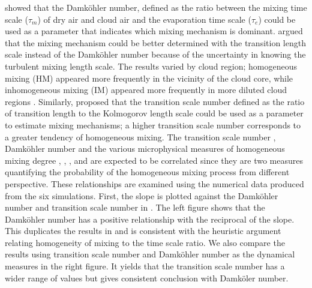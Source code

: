 \cite{Burnet2007Observational} showed that the Damk\"{o}hler number, defined as the ratio between the mixing time scale ($\tau_m$) of dry air and cloud air and the evaporation time scale ($\tau_e$) could be used as a parameter that indicates which mixing mechanism is dominant. \cite{Lehmann2009} argued that the mixing mechanism could be better determined with the transition length scale instead of the Damk\"{o}hler number because of the uncertainty in knowing the turbulent mixing length scale. The results varied by cloud region; homogeneous mixing (HM) appeared more frequently in the vicinity of the cloud core, while inhomogeneous mixing (IM) appeared more frequently in more diluted cloud regions \cite{Lehmann2009}. Similarly, \cite{Lu2011} proposed that the transition scale number defined as the ratio of transition length to the Kolmogorov length scale could be used as a parameter to estimate mixing mechanisms; a higher transition scale number corresponds to a greater tendency of homogeneous mixing.
The transition scale number , Damk\"{o}hler number  and the various microphysical measures of homogeneous mixing degree , , ,  and  are expected to be correlated since they are two measures quantifying the probability of the homogeneous mixing process from different perspective. These relationships are examined using the numerical data produced from the six simulations.  First, the slope  is plotted against the Damk\"{o}hler number and transition scale number in . The left figure shows that the Damk\"{o}hler number has a positive relationship with the reciprocal of the slope. This duplicates the results in \cite{And09} and is consistent with the heuristic argument relating homogeneity of mixing to the time scale ratio. We also compare the results using transition scale number and Damk\"{o}hler number as the dynamical measures in the right figure. It yields that the transition scale number has a wider range of values but gives consistent conclusion with Damk\"{o}ler number.

